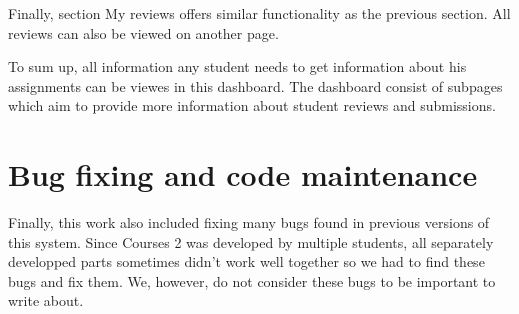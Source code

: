 Finally, section My reviews offers similar functionality as the previous section. All reviews can also be viewed on another page.


To sum up, all information any student needs to get information about his assignments can be viewes in this dashboard. The dashboard consist of subpages which aim to provide more information about student reviews and submissions. 

\section{Bug fixing and code maintenance}
Finally, this work also included fixing many bugs found in previous versions of this system. Since Courses 2 was developed by multiple students, all separately developped parts sometimes didn't work well together so we had to find these bugs and fix them. We, however, do not consider these bugs to be important to write about.

